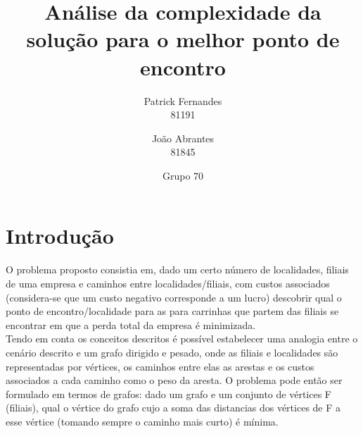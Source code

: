 \documentclass[12pt]{article}
\title{Análise da complexidade da solução para o melhor ponto de encontro}
\author{Patrick Fernandes\\81191 \and João Abrantes\\81845}
\date{Grupo 70}
\begin{document}
\maketitle
\section{Introdução}
O problema proposto consistia em, dado um certo número de localidades, filiais de uma empresa e caminhos entre localidades/filiais, com custos associados (considera-se que um custo negativo corresponde a um lucro) descobrir qual o ponto de encontro/localidade para as para carrinhas que partem das filiais se encontrar em que a perda total da empresa é minimizada.\\
\indent Tendo em conta os conceitos descritos é possível estabelecer uma analogia entre o cenário descrito e um grafo dirigido e pesado, onde as filiais e localidades são representadas por vértices, os caminhos entre elas as arestas e os custos associados a cada caminho como o peso da aresta. O problema pode então ser formulado em termos de grafos: dado um grafo e um conjunto de vértices F (filiais), qual o vértice do grafo cujo a soma das distancias dos vértices de F a esse vértice (tomando sempre o caminho mais curto) é mínima.
\end{document}
